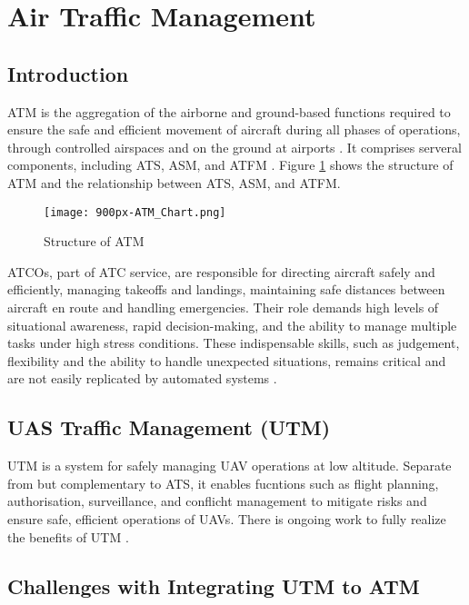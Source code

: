 \section{Air Traffic Management}

\subsection{Introduction}

\Gls{ATM} is the aggregation of the airborne and ground-based functions required to ensure the safe and efficient movement of aircraft during all phases of operations, through controlled airspaces and on the ground at airports \cite{skybraryATM}.
It comprises serveral components, including \gls{ATS}, \gls{ASM}, and \gls{ATFM} \cite{skybraryATM}.
Figure \ref{fig:atm-structure} shows the structure of \gls{ATM} and the relationship between \gls{ATS}, \gls{ASM}, and \gls{ATFM}.

\begin{figure}[h]
    \centering
    \texttt{[image: 900px-ATM\_Chart.png]}
    \caption{Structure of \gls{ATM} \cite{skybraryATM}}
    \label{fig:atm-structure}
\end{figure}

\Glspl{ATCO}, part of \gls{ATC} service, are responsible for directing aircraft safely and efficiently, managing takeoffs and landings, maintaining safe distances between aircraft en route and handling emergencies. 
Their role demands high levels of situational awareness, rapid decision-making, and the ability to manage multiple tasks under high stress conditions.
These indispensable skills, such as judgement, flexibility and the ability to handle unexpected situations, remains critical and are not easily replicated by automated systems \cite{eurocontrol2024digitalisation}.


\subsection{UAS Traffic Management (UTM)}

\Gls{UTM} is a system for safely managing \gls{UAV} operations at low altitude. 
Separate from but complementary to \gls{ATS}, it enables fucntions such as flight planning, authorisation, surveillance, and conflicht management to mitigate risks and ensure safe, efficient operations of \glspl{UAV}.
There is ongoing work to fully realize the benefits of \gls{UTM} \cite{faa_utm}.


\subsection{Challenges with Integrating UTM to ATM}

